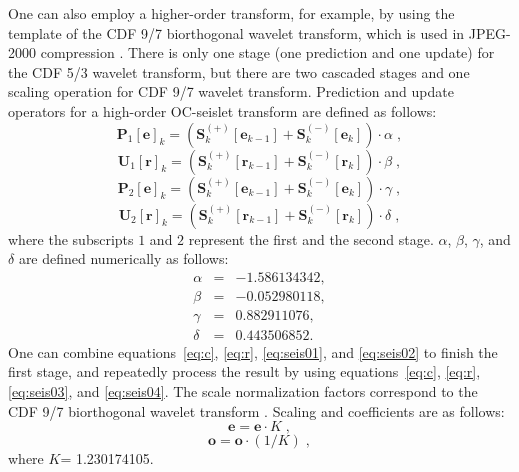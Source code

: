 One can also employ a higher-order transform, for example, by using
the template of the CDF 9/7 biorthogonal wavelet transform, which is
used in JPEG-2000 compression \cite[]{Lian01}. There is only one
stage (one prediction and one update) for the CDF 5/3 wavelet
transform, but there are two cascaded stages and one scaling operation
for CDF 9/7 wavelet transform. Prediction and update operators for a
high-order OC-seislet transform are defined as follows: 
\begin{equation}
  \label{eq:seis01}
  \mathbf{P}_1[\mathbf{e}]_k=(\mathbf{S}_k^{(+)}[\mathbf{e}_{k-1}]+
  \mathbf{S}_k^{(-)}[\mathbf{e}_{k}]) \cdot {\alpha}\;,
\end{equation}
\begin{equation}
  \label{eq:seis02}
  \mathbf{U}_1[\mathbf{r}]_k=(\mathbf{S}_k^{(+)}[\mathbf{r}_{k-1}]+
  \mathbf{S}_k^{(-)}[\mathbf{r}_{k}]) \cdot {\beta}\;,
\end{equation}
\begin{equation}
  \label{eq:seis03}
  \mathbf{P}_2[\mathbf{e}]_k=(\mathbf{S}_k^{(+)}[\mathbf{e}_{k-1}]+
  \mathbf{S}_k^{(-)}[\mathbf{e}_{k}]) \cdot {\gamma}\;,
\end{equation}
\begin{equation}
  \label{eq:seis04}
  \mathbf{U}_2[\mathbf{r}]_k=(\mathbf{S}_k^{(+)}[\mathbf{r}_{k-1}]+
  \mathbf{S}_k^{(-)}[\mathbf{r}_{k}]) \cdot {\delta}\;,
\end{equation}
where the subscripts $1$ and $2$ represent the first and the
second stage. $\alpha$, $\beta$, $\gamma$, and $\delta$ are defined
numerically as follows:
\begin{eqnarray*}
\alpha &=& -1.586134342, \\ 
\beta  &=& -0.052980118, \\ 
\gamma &=& 0.882911076, \\
\delta &=& 0.443506852.
\end{eqnarray*}
One can combine equations~\ref{eq:c}, \ref{eq:r}, 
\ref{eq:seis01}, and \ref{eq:seis02} to finish the first stage, and 
repeatedly process the result by using equations~\ref{eq:c}, \ref{eq:r},
\ref{eq:seis03}, and \ref{eq:seis04}. The scale normalization factors
correspond to the CDF 9/7 biorthogonal wavelet transform
\cite[]{Daubechies98}. Scaling and coefficients
are as follows:
\begin{equation}
  \label{eq:cdf05} \mathbf{e}=\mathbf{e} \cdot K\;,
\end{equation}
\begin{equation}
  \label{eq:cdf06}
  \mathbf{o}=\mathbf{o} \cdot (1/K)\;,
\end{equation} 
where $K$= 1.230174105.
 
